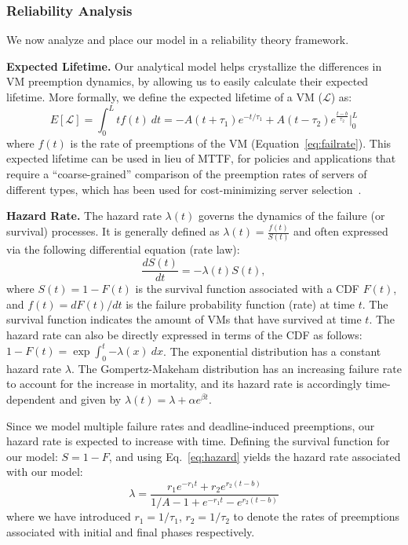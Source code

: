 \documentclass[compsoc]{IEEEtran}
\begin{document}
\subsubsection{Reliability Analysis}
\label{subsec:reliability}

We now analyze and place our model in a reliability theory framework. 

\noindent \textbf{Expected Lifetime.} Our analytical model helps crystallize the differences in VM preemption dynamics, by allowing us to easily calculate their expected lifetime. 
More formally, we define the expected lifetime of a VM ($\mathscr{L}$) as: 
\begin{equation}
  \label{eq:expected-lifetime}
E[\mathscr{L}] =  \int_{0}^{L} t {f}(t)~dt =  -A(t+\tau_1)e^{-t/\tau_1} + A(t-\tau_2) e^{\frac{t-b}{\tau_2}} \biggr\rvert_{0}^{L}
\end{equation}
where $f(t)$ is the rate of preemptions of the VM (Equation~\ref{eq:failrate}).
This expected lifetime can be used in lieu of MTTF, for policies and applications that require a ``coarse-grained'' comparison of the preemption rates of servers of different types, which has been used for cost-minimizing server selection~\cite{flint}. 


\noindent \textbf{Hazard Rate.}
The hazard rate $\lambda(t)$ governs the dynamics of the failure (or survival) processes. It is generally defined as $\lambda(t) = \frac{f(t)}{S(t)}$ and often expressed via the following differential equation (rate law):
\begin{equation}\label{eq:hazard}
\frac{dS(t)}{dt} = -\lambda(t) S(t),
\end{equation}
where $S(t) = 1 - F(t)$ is the survival function associated with a CDF $F(t)$, and $f(t)=dF(t)/dt$ is the failure probability function (rate) at time $t$. The survival function indicates the amount of VMs that have survived at time $t$.
The hazard rate can also be directly expressed in terms of the CDF as follows: $1-F(t) = \exp{\int_0^t{-\lambda(x) ~dx}}$. 
The exponential distribution has a constant hazard rate $\lambda$.
The Gompertz-Makeham distribution has an increasing failure rate to account for the increase in mortality, and its hazard rate is accordingly time-dependent and given by $\lambda(t) = \lambda + \alpha e^{\beta t}$.

Since we model multiple failure rates and deadline-induced preemptions, our hazard rate is expected to increase with time. Defining the survival function for our model: $S = 1 - F$, and using Eq.~\ref{eq:hazard} yields the hazard rate associated with our model: 
\noindent 
\begin{equation}
  \label{eq:hmodel}
  \lambda 
  = \dfrac{r_1 e^{- r_1 t} + r_2 e^{r_2 (t - b)}}{1/A - 1 + e^{- r_1 t} - e^{r_2 (t - b)}}
\end{equation}
where we have introduced $r_1 = 1/\tau_1$, $r_2 = 1/\tau_2$ to denote the rates of preemptions associated with initial and final phases respectively.
\end{document}
